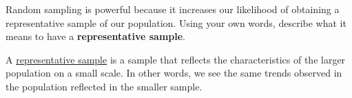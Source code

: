 \documentclass[noanswers]{exam}
\begin{document}
\begin{questions}
	
	\question Random sampling is powerful because it increases our likelihood of obtaining a representative sample of our population. Using your own words, describe what it means to have a \textbf{representative sample}.

	\begin{solution}[\stretch{1}]
			\vspace{3mm}
					
			A \underline{representative sample} is a sample that reflects the characteristics of the larger population on a small scale. In other words, we see the same trends observed in the population reflected in the smaller sample.
			
		\end{solution}

\end{questions}

\end{document}
